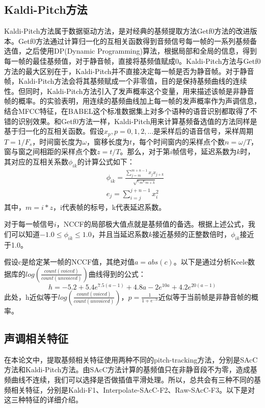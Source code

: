 \subsection{Kaldi-Pitch方法}
Kaldi-Pitch方法\cite{ghahremani2014pitch}属于数据驱动方法，是对经典的基频提取方法Getf0方法\cite{kleijn1995robust}的改进版本。Getf0方法通过计算归一化的互相关函数得到音频信号每一帧的一系列基频备选值，之后使用DP(Dynamic Programming)算法，根据局部和全局的信息，得到每一帧的最佳基频值，对于静音帧，直接将基频值赋成0。Kaldi-Pitch方法与Getf0方法的最大区别在于，Kaldi-Pitch并不直接决定每一帧是否为静音帧。对于静音帧，Kaldi-Pitch方法会将其基频赋成一个非零值，目的是保持基频曲线的连续性。但同时，Kaldi-Pitch方法引入了发声概率这个变量，用来描述该帧是非静音帧的概率。\cite{ghahremani2014pitch}的实验表明，用连续的基频曲线加上每一帧的发声概率作为声调信息，结合MFCC特征，在BABEL这个标准数据集上对多个语种的语音识别都取得了不错的识别效果。和Getf0方法一样，Kaldi-Pitch用来计算基频备选值的方法同样是基于归一化的互相关函数。假设$x_p,p=0,1,2,...$是采样后的语音信号，采样周期$T=1/F_s$，时间窗长度为$\omega$，窗移长度为$t$，每个时间窗内的采样点个数$n=\omega/T$，窗与窗之间相距的采样点个数$z=t/T$。那么，对于第$i$帧信号，延迟系数为$k$时，其对应的互相关系数$\phi_{ik}$的计算公式如下：
\begin{eqnarray}
  &\phi_{ik}=\frac{\sum_{j=m}^{m+n-1} x_j x_{j+k}}{\sqrt{e_m e_{m+k}}} \\
  &e_j=\sum_{i=j}^{j+n-1} x_i^2
\end{eqnarray}
其中，$m=i*z$，i代表帧的标号，k代表延迟系数。

对于每一帧信号$i$，NCCF的局部极大值点就是基频值的备选。根据上述公式，我们可以知道$-1.0\leqslant\phi_{ik}\leqslant1.0$，并且当延迟系数$k$接近基频的正整数倍时，$\phi_{ik}$接近于1.0。

假设c是给定某一帧的NCCF值，其绝对值$a=abs(c)$。以下是通过分析Keele数据库的$log(\frac{count(voiced)}{count(unvoiced)})$曲线得到的公式：
\begin{equation}h=-5.2+5.4 e^{7.5 (a-1)}+4.8 a-2 e^{10 a}+4.2 e^{20 (a-1)}\end{equation}
此处，h近似等于$log(\frac{count(voiced)}{count(unvoiced)})$，$p=\frac{1}{1+e^{-h}}$近似等于当前帧是非静音帧的概率。
\subsection{声调相关特征}
在本论文中，提取基频相关特征使用两种不同的pitch-tracking方法，分别是SAcC方法和Kaldi-Pitch方法。由SAcC方法计算的基频值只在非静音段不为零，造成基频曲线不连续，我们可以选择是否做插值平滑处理。所以，总共会有三种不同的基频相关特征，分别是Kaldi-F1、Interpolate-SAcC-F2、Raw-SAcC-F3。以下是对这三种特征的详细介绍。

